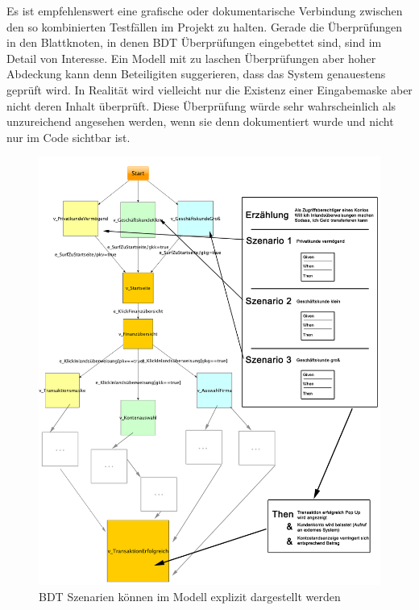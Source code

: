 Es ist empfehlenswert eine grafische oder dokumentarische Verbindung zwischen den so kombinierten Testfällen im Projekt zu halten. Gerade die Überprüfungen in den Blattknoten, in denen \Gls{BDT} Überprüfungen eingebettet sind, sind im Detail von Interesse. Ein Modell mit zu laschen Überprüfungen aber hoher Abdeckung kann denn Beteiligiten suggerieren, dass das System genauestens geprüft wird. In Realität wird vielleicht nur die Existenz einer Eingabemaske aber nicht deren Inhalt überprüft. Diese Überprüfung würde sehr wahrscheinlich als unzureichend angesehen werden, wenn sie denn dokumentiert wurde und nicht nur im Code sichtbar ist.

\begin{figure}
\hspace*{-2cm}
  \centering
     \includegraphics[width=1.25\textwidth]{figures/mbt_bdt_gesamt.png}
  \caption{BDT Szenarien können im Modell explizit dargestellt werden}
  \label{fig:mbt_bdt_gesamt}
\end{figure}










